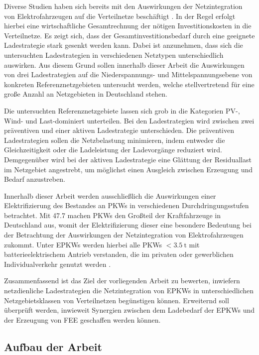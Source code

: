 Diverse Studien haben sich bereits mit den Auswirkungen der Netzintegration von Elektrofahrzeugen auf die Verteilnetze beschäftigt \cite{Agora2019} \cite{DEAGH2018} \cite{BCG2018}.
In der Regel erfolgt hierbei eine wirtschaftliche Gesamtrechnung der nötigen Investitionskosten in die Verteilnetze.
Es zeigt sich, dass der Gesamtinvestitionsbedarf durch eine geeignete Ladestrategie stark gesenkt werden kann.
Dabei ist anzunehmen, dass sich die untersuchten Ladestrategien in verschiedenen Netztypen unterschiedlich auswirken.
Aus diesem Grund sollen innerhalb dieser Arbeit die Auswirkungen von drei Ladestrategien auf die Niederspannungs- und Mittelspannungsebene von konkreten Referenznetzgebieten untersucht werden, welche stellvertretend für eine große Anzahl an Netzgebieten in Deutschland stehen.\medskip

Die untersuchten Referenznetzgebiete lassen sich grob in die Kategorien \gls{PV}-, Wind- und Last-dominiert unterteilen.
Bei den Ladestrategien wird zwischen zwei präventiven und einer aktiven Ladestrategie unterschieden.
Die präventiven Ladestrategien sollen die Netzbelastung minimieren, indem entweder die Gleichzeitigkeit oder die Ladeleistung der Ladevorgänge reduziert wird.
Demgegenüber wird bei der aktiven Ladestrategie eine Glättung der Residuallast im Netzgebiet angestrebt, um möglichst einen Ausgleich zwischen Erzeugung und Bedarf anzustreben.\medskip

Innerhalb dieser Arbeit werden ausschließlich die Auswirkungen einer Elektrifizierung des Bestandes an \glspl{PKW} in verschiedenen Durchdringungsstufen betrachtet.
Mit \SI{47.7}{\MioFZs} \cite{KBA2020a} machen \glspl{PKW} den Großteil der Kraftfahrzeuge in Deutschland aus, womit der Elektrifizierung dieser eine besondere Bedeutung bei der Betrachtung der Auswirkungen der Netzintegration von Elektrofahrzeugen zukommt.
Unter \glspl{EPKW} werden hierbei alle \glspl{PKW} \(<\!\SI{3.5}{\tonne}\) mit batterieelektrischem Antrieb verstanden, die im privaten oder gewerblichen Individualverkehr genutzt werden \cite{BNetzA2020}. \medskip

Zusammenfassend ist das Ziel der vorliegenden Arbeit zu bewerten, inwiefern netzdienliche Ladestrategien die Netzintegration von \glspl{EPKW} in unterschiedlichen Netzgebietsklassen von Verteilnetzen begünstigen können.
Erweiternd soll überprüft werden, inwieweit Synergien zwischen dem Ladebedarf der \glspl{EPKW} und der Erzeugung von \gls{FEE} geschaffen werden können.


\subsection{Aufbau der Arbeit}


